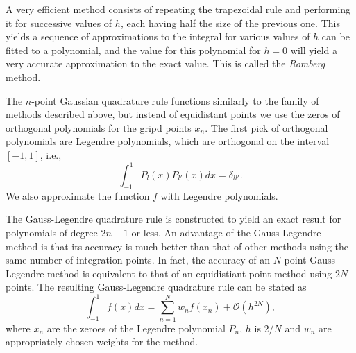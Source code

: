     A very efficient method consists of repeating the trapezoidal rule and 
    performing it for successive values of $h$, each having half the size of the 
    previous one. This yields a sequence of approximations to the integral for various 
    values of $h$ can be fitted to a polynomial, and the value for this polynomial 
    for $h=0$ will yield a very accurate approximation to the exact value. This is
    called the \emph{Romberg} method.

    The $n$-point Gaussian quadrature rule functions similarly to the family of methods 
    described above, but instead of equidistant points we use the zeros of 
    orthogonal polynomials for the gripd points $x_n$. The first pick of orthogonal 
    polynomials are Legendre polynomials, which are orthogonal on the interval $[-1,1]$,
    i.e.,
    \begin{equation}
        \int_{-1}^1 P_l(x) P_{l'}(x) dx = \delta_{ll'}.
    \end{equation}
    We also approximate the function $f$ with Legendre polynomials. 
    
    The Gauss-Legendre quadrature rule is constructed to yield an exact 
    result for polynomials of degree $2n-1$ or less. An advantage of the Gauss-Legendre 
    method is that its accuracy is much better than that of other methods using the 
    same number of integration points. In fact, the accuracy of an $N$-point Gauss-Legendre 
    method is equivalent to that of an equidistiant point method using $2N$ points.
    The resulting Gauss-Legendre quadrature rule can be stated as 
    \begin{equation}
        \int_{-1}^1 f(x) dx = \sum_{n=1}^N w_n f(x_n) + \mathscr{O}(h^{2N}),
    \end{equation}
    where $x_n$ are the zeroes of the Legendre polynomial $P_n$, $h$ is $2/N$ and 
    $w_n$ are appropriately chosen weights for the method.
    
